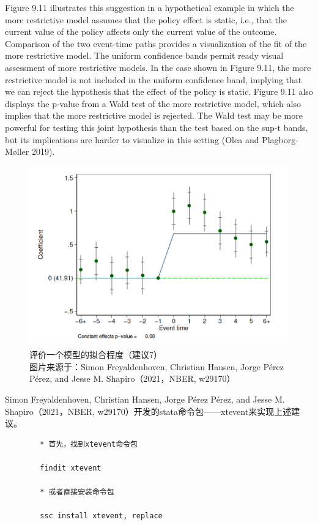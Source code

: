 \documentclass[cn,12pt,math=newtx,citestyle=gb7714-2015,bibstyle=gb7714-2015]{elegantbook}
\begin{document}
Figure 9.11 illustrates this suggestion in a hypothetical example in which the more restrictive model assumes that the policy effect is static, i.e., that the current value of the policy affects only the current value of the outcome. Comparison of the two event-time paths provides a visualization of the fit of the more restrictive model. The uniform confidence bands permit ready visual assessment of more restrictive models. In the case shown in Figure 9.11, the more restrictive model is not included in the uniform confidence band, implying that we can reject the hypothesis that the effect of the
policy is static. Figure 9.11 also displays the p-value from a Wald test of the more restrictive model, which also implies that the more restrictive model is rejected. The Wald test may be more powerful for testing this joint hypothesis than the test based on the sup-t bands, but its implications are harder to visualize in this setting (Olea and Plagborg-Møller 2019).



\begin{figure}[tbph]
	\centering
	\includegraphics[width=1\linewidth]{sug7}
	\caption{评价一个模型的拟合程度（建议7）\\ 图片来源于：Simon Freyaldenhoven, Christian Hansen, Jorge Pérez Pérez, and Jesse M. Shapiro（2021，NBER, w29170）}
	\label{fig:sug7}
\end{figure}
	
	Simon Freyaldenhoven, Christian Hansen, Jorge Pérez Pérez, and Jesse M. Shapiro（2021，NBER, w29170）开发的stata命令包——xtevent来实现上述建议。
	
	\begin{lstlisting}
		* 首先，找到xtevent命令包
		
		findit xtevent
		
		* 或者直接安装命令包
		
		ssc install xtevent, replace
		
	\end{lstlisting}
	
\end{document}
